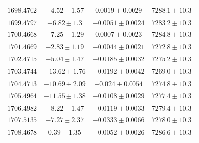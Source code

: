 \documentclass[fleqn,usenatbib]{mnras}
\begin{document}
\begin{table}
\begin{tabular}{lccc}
$1698.4702$ & $-4.52\pm1.57$ & $0.0019\pm0.0029$ & $7288.1\pm10.3$ \\
$1699.4797$ & $-6.82\pm1.3$ & $-0.0051\pm0.0024$ & $7283.2\pm10.3$ \\
$1700.4668$ & $-7.25\pm1.29$ & $0.0007\pm0.0023$ & $7284.8\pm10.3$ \\
$1701.4669$ & $-2.83\pm1.19$ & $-0.0044\pm0.0021$ & $7272.8\pm10.3$ \\
$1702.4715$ & $-5.04\pm1.47$ & $-0.0185\pm0.0032$ & $7275.2\pm10.3$ \\
$1703.4744$ & $-13.62\pm1.76$ & $-0.0192\pm0.0042$ & $7269.0\pm10.3$ \\
$1704.4713$ & $-10.69\pm2.09$ & $-0.024\pm0.0054$ & $7274.8\pm10.3$ \\
$1705.4964$ & $-11.55\pm1.38$ & $-0.0108\pm0.0029$ & $7277.4\pm10.3$ \\
$1706.4982$ & $-8.22\pm1.47$ & $-0.0119\pm0.0033$ & $7279.4\pm10.3$ \\
$1707.5135$ & $-7.27\pm2.37$ & $-0.0333\pm0.0066$ & $7278.0\pm10.3$ \\
$1708.4678$ & $0.39\pm1.35$ & $-0.0052\pm0.0026$ & $7286.6\pm10.3$ \\
\hline
\hline
\end{tabular}
\end{table}
\end{document}
